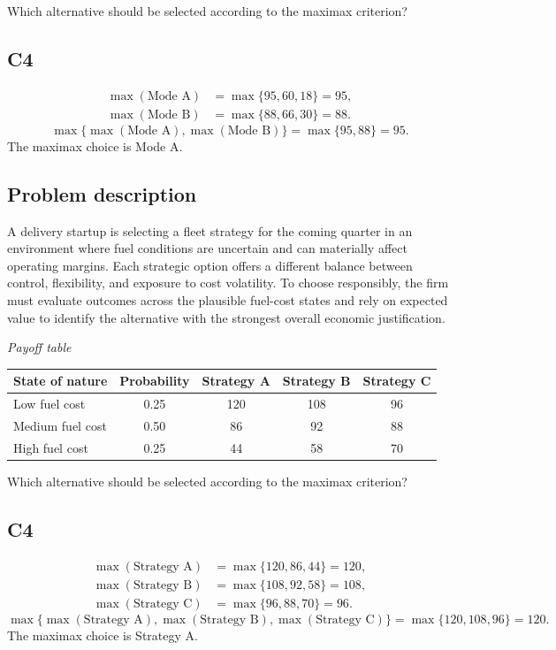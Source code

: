 \begin{ExamProblems}
		Which alternative should be selected according to the maximax criterion?

		\subsection*{C4}
		\[
		\begin{aligned}
		\max(\text{Mode A}) &= \max\{95,60,18\} = 95,\\
		\max(\text{Mode B}) &= \max\{88,66,30\} = 88.
		\end{aligned}
		\]
		\[
		\max\{\max(\text{Mode A}),\max(\text{Mode B})\}
		= \max\{95,88\}
		= 95.
		\]
		The maximax choice is Mode A.
		\item
		\subsection*{Problem description}
		A delivery startup is selecting a fleet strategy for the coming quarter in an environment where fuel conditions are uncertain and can materially affect operating margins. Each strategic option offers a different balance between control, flexibility, and exposure to cost volatility. To choose responsibly, the firm must evaluate outcomes across the plausible fuel-cost states and rely on expected value to identify the alternative with the strongest overall economic justification.

		\begin{center}
			\textit{Payoff table} \par
			\begin{tabular}{l c c c c}
				\toprule
				State of nature & Probability & Strategy A & Strategy B & Strategy C \\
				\midrule
				Low fuel cost & 0.25 & 120 & 108 & 96 \\
				Medium fuel cost & 0.50 & 86 & 92 & 88 \\
				High fuel cost & 0.25 & 44 & 58 & 70 \\
				\bottomrule
			\end{tabular}
		\end{center}

		Which alternative should be selected according to the maximax criterion?

		\subsection*{C4}
		\[
		\begin{aligned}
		\max(\text{Strategy A}) &= \max\{120,86,44\} = 120,\\
		\max(\text{Strategy B}) &= \max\{108,92,58\} = 108,\\
		\max(\text{Strategy C}) &= \max\{96,88,70\} = 96.
		\end{aligned}
		\]
		\[
		\max\{\max(\text{Strategy A}),\max(\text{Strategy B}),\max(\text{Strategy C})\}
		= \max\{120,108,96\}
		= 120.
		\]
		The maximax choice is Strategy A.
		\item

\end{ExamProblems}
